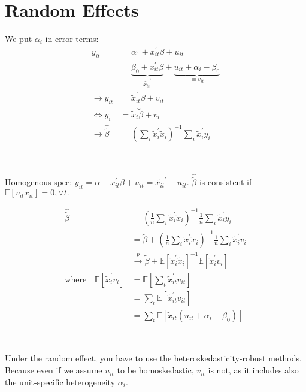 \section{Random Effects}
We put $\alpha_i$ in error terms: 
\begin{align*}
    y_{it} &= \alpha_1 + x_{it}^{\prime} \beta + u_{it} \\
    &= \underset{\tilde{x_{it}}^{\prime}}{\underbrace{\beta_0 + x_{it}^{\prime}\beta}} + \underset{\equiv v_{it}}{\underbrace{u_{it} + \alpha_i - \beta_0}}\\
    \rightarrow y_{it} &= \tilde{x}_{it}^{\prime} \beta + v_{it} \\
    \Leftrightarrow y_i &= \tilde{x}_i^{\prime} \tilde{\beta} + v_i \\
    \rightarrow \hat{\tilde{\beta}} &= \left(\sum_i \tilde{x}_i^{\prime} \tilde{x}_i \right)^{-1} \sum_i \tilde{x}_i^{\prime} y_i
\end{align*}

\begin{note}[POLS]
    \

    Homogenous spec: $y_{it} = \alpha  + x_{it}^{\prime} \beta + u_{it} = \tilde{x_{it}}^{\prime} + u_{it}.$
    $\hat{\tilde{\beta}}$ is consistent if $\mathbb{E}[v_{it} x_{it}]=0, \forall t.$
\end{note}

\begin{align*}
    \hat{\tilde{\beta}} &= \left(\frac{1}{n} \sum_i \tilde{x}_i^{\prime} \tilde{x}_i \right)^{-1} \frac{1}{n} \sum_i \tilde{x}_i^{\prime} y_i \\
    &= \tilde{\beta} + \left(\frac{1}{n} \sum_i \tilde{x}_i^{\prime} \tilde{x}_i \right)^{-1} \frac{1}{n} \sum_i \tilde{x}_i^{\prime} v_i \\
    &\overset{p}{\rightarrow} \tilde{\beta} + \mathbb{E}[\tilde{x}_i^{\prime} \tilde{x}_i]^{-1} \mathbb{E}[\tilde{x}_i^{\prime} v_i] \\
    \text{where} \quad \mathbb{E}[\tilde{x}_i^{\prime} v_i] &= \mathbb{E}\left[\sum_t \tilde{x}_{it}^{\prime} v_{it} \right] \\
    &= \sum_t \mathbb{E}\left[\tilde{x}_{it}^{\prime} v_{it}  \right] \\
    &= \sum_t \mathbb{E}\left[\tilde{x}_{it}(u_{it} + \alpha_i - \beta_0)\right]
\end{align*}

\begin{note}
    \

    Under the random effect, you have to use the heteroskedasticity-robust methods.
    Because even if we assume $u_{it}$ to be homoskedastic, $v_{it}$ is not,
    as it includes also the unit-speciﬁc heterogeneity $\alpha_i$.
\end{note}

